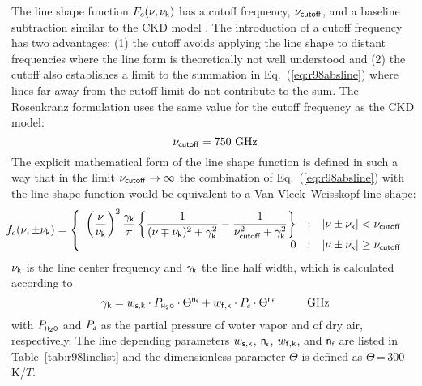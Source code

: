 The line shape function $F_{c}(\nu,\nu_{\sf k})$ has a cutoff frequency, $\nu_{\sf cutoff}$,
and a baseline subtraction similar to the CKD model \cite{clough:89}.
The introduction of a cutoff frequency has two advantages: (1) the
cutoff avoids applying the line shape to distant frequencies where the 
line form is theoretically not well understood and (2) the cutoff also
establishes a limit to the summation in Eq.~(\ref{eq:r98absline}) where lines
far away from the cutoff limit do not contribute to the sum.  
The Rosenkranz formulation uses the same value for
the cutoff frequency as the CKD model:
\begin{equation} 
 \label{cutoff}
 \nu_{\sf cutoff} = 750\mbox{ GHz}
\end{equation}
%
The explicit mathematical form of the line shape function is defined 
in such a way that in the limit $\nu_{\sf cutoff} \rightarrow \infty$ the 
combination of Eq.~(\ref{eq:r98absline}) with the line shape function would 
be equivalent to a Van Vleck--Weisskopf \citep{vanvleck:45} line shape: 
\begin{equation}
 \label{eq:r98lineshape}
 \hspace*{-5mm}\shapefpm = 
   \left \{ \begin{array}{r@{\quad:\quad}l} 
   \left (\displaystyle{\frac{\nu}{\nuk}}\right )^2 
   \displaystyle{\frac{\gamk}{\pi}} 
   \left \{ \displaystyle{\frac{1}{(\nu \mp \nuk)^2 + \gamk^2}} - 
   \displaystyle{\frac{1}{\nucut^2 + \gamk^2}} \right \}
   & |\nu \pm \nuk| < \nucut \\ 
   0 & |\nu \pm \nuk| \geq \nucut
                       \end{array} \right.
\end{equation}
$\nu_{\sf k}$ is the line center frequency and $\gamma_{\sf k}$ the line
half width, which is calculated according to 
\begin{equation}
 \label{eq:r98gamma}
 \gamk = \ws \cdot \phzo \cdot \Theta^{\xs} + 
         \wf \cdot \pda  \cdot \Theta^{\xf}\hspace*{10mm}\mbox{GHz}
\end{equation}
with $P_{\mbox{\tiny \sf H}_{2}\mbox{\tiny \sf O}}$ and $P_{\mbox{\tiny \sf d}}$ as the partial pressure of water vapor and of 
dry air, respectively. The line depending parameters $w_{\sf s,k}$, ${\sf n}_{\mbox{\tiny \sf s}}$, 
$w_{\sf f,k}$, and ${\sf n}_{\mbox{\tiny \sf f}}$ are listed in Table~\ref{tab:r98linelist} and the 
dimensionless parameter $\Theta$ is defined as $\Theta$\,=\,300\,K/$T$.

